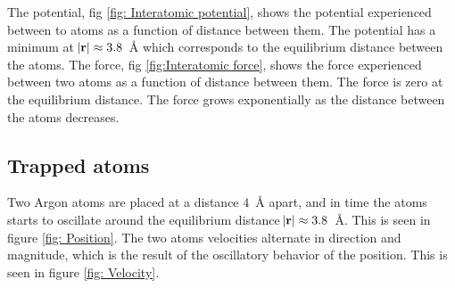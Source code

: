 \documentclass[a4paper]{article}
\begin{document}
The potential, fig \ref{fig: Interatomic potential}, shows the potential experienced between to atoms as a function of distance between them. The potential has a minimum at $\abs{\mathbf{r}} \approx 3.8$~Å which corresponds to the equilibrium distance between the atoms.
The force, fig \ref{fig:Interatomic force}, shows the force experienced between two atoms as a function of distance between them. The force is zero at the equilibrium distance. The force grows exponentially as the distance between the atoms decreases. 

\subsection{Trapped atoms}
Two Argon atoms are placed at a distance $4$~Å apart, and in time the atoms starts to oscillate around the equilibrium distance $\abs{\mathbf{r}} \approx 3.8$~Å. This is seen in figure \ref{fig: Position}.
The two atoms velocities alternate in direction and magnitude, which is the result of the oscillatory behavior of the position. This is seen in figure \ref{fig: Velocity}.
\end{document}
